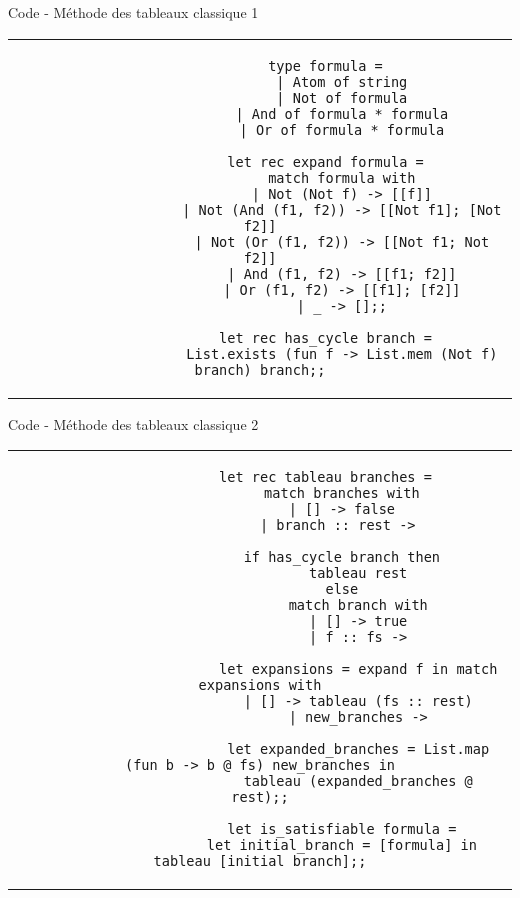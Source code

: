 \documentclass[]{beamer}
\begin{document}
\begin{frame}[fragile]{Code - Méthode des tableaux classique 1}
    \begin{center}
        \begin{tabular}{c}
            \begin{lstlisting}
                type formula =
                    | Atom of string
                    | Not of formula
                    | And of formula * formula
                    | Or of formula * formula

                let rec expand formula =
                    match formula with
                    | Not (Not f) -> [[f]]
                    | Not (And (f1, f2)) -> [[Not f1]; [Not f2]]
                    | Not (Or (f1, f2)) -> [[Not f1; Not f2]]
                    | And (f1, f2) -> [[f1; f2]]
                    | Or (f1, f2) -> [[f1]; [f2]]
                    | _ -> [];;

                let rec has_cycle branch =
                    List.exists (fun f -> List.mem (Not f) branch) branch;;
            \end{lstlisting}
        \end{tabular}
      \end{center}
\end{frame}

\begin{frame}[fragile]{Code - Méthode des tableaux classique 2}
    \begin{center}
        \begin{tabular}{c}
            \begin{lstlisting}
                let rec tableau branches =
                    match branches with
                    | [] -> false
                    | branch :: rest -> 

                    if has_cycle branch then
                        tableau rest
                    else
                        match branch with
                        | [] -> true
                        | f :: fs ->

                        let expansions = expand f in match expansions with
                        | [] -> tableau (fs :: rest)
                        | new_branches ->
                        
                        let expanded_branches = List.map (fun b -> b @ fs) new_branches in
                        tableau (expanded_branches @ rest);;

                    let is_satisfiable formula =
                    let initial_branch = [formula] in tableau [initial_branch];;
            \end{lstlisting}
        \end{tabular}
    \end{center}
\end{frame}
\end{document}
